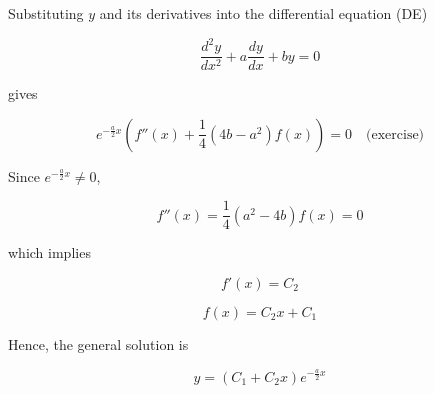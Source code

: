 \documentclass{article}
\begin{document}
\begin{enumerate}
\begin{itemize}
\begin{itemize}
                  Substituting \( y \) and its derivatives into the differential equation (DE)

                  \[
                  \frac{d^2y}{dx^2} + a\frac{dy}{dx} + by = 0
                  \]

                  gives

                  \[
                  e^{-\frac{a}{2}x} \left( f''(x) + \frac{1}{4}(4b - a^2)f(x) \right) = 0 \quad \text{(exercise)}
                  \]

                  Since \( e^{-\frac{a}{2}x} \neq 0 \),

                  \[
                  f''(x) = \frac{1}{4}(a^2 - 4b)f(x) = 0
                  \]

                  which implies

                  \[
                  f'(x) = C_2
                  \]

                  \[
                  f(x) = C_2 x + C_1
                  \]

                  Hence, the general solution is

                  \[
                  y = (C_1 + C_2 x) e^{-\frac{a}{2}x}
                  \]


            \end{itemize}
        \end{itemize}

      \end{enumerate}
\end{document}
